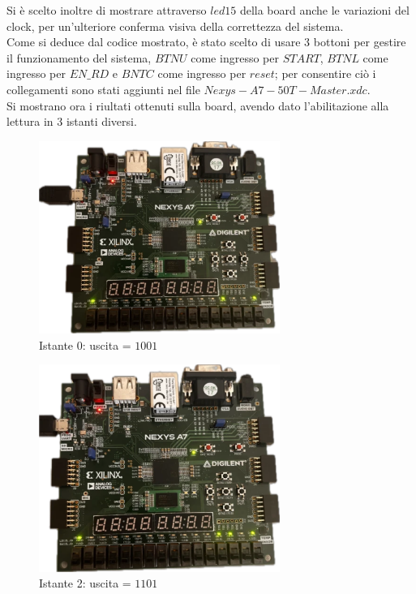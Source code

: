 Si è scelto inoltre di mostrare attraverso $led 15$ della board anche le variazioni del clock, per un'ulteriore conferma visiva della correttezza del sistema.\\
Come si deduce dal codice mostrato, è stato scelto di usare 3 bottoni per gestire il funzionamento del sistema, $BTNU$ come ingresso per $START$, $BTNL$ come ingresso per $EN\_RD$ e $BNTC$ come ingresso per $reset$; per consentire ciò i collegamenti sono stati aggiunti nel file $Nexys-A7-50T-Master.xdc$.\\
Si mostrano ora i riultati ottenuti sulla board, avendo dato l'abilitazione alla lettura in 3 istanti diversi.
\begin{figure}[H]
	\centering
	\includegraphics[width=0.7\textwidth]{img/Test1_ROM_M_MEMwebp.png}
	\caption{Istante 0: uscita = $1001$}
	\label{schemROM_M_MEM} 
\end{figure}

\begin{figure}[H]
	\centering
	\includegraphics[width=0.7\textwidth]{img/Test2_ROM_M_MEMwebp.png}
	\caption{Istante 2: uscita = $1101$}
	\label{schemROM_M_MEM} 
\end{figure}


